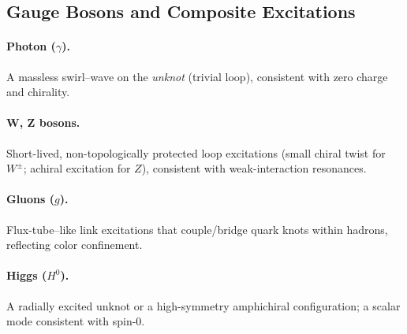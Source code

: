 \documentclass[smallextended]{svjour3}       %
\begin{document}
    \subsection{Gauge Bosons and Composite Excitations}

    \paragraph{Photon ($\gamma$).}
        A massless swirl–wave on the \emph{unknot} (trivial loop), consistent with zero charge and chirality.

    \paragraph{W, Z bosons.}
        Short-lived, non-topologically protected loop excitations (small chiral twist for $W^\pm$; achiral excitation for $Z$), consistent with weak-interaction resonances.

    \paragraph{Gluons ($g$).}
        Flux-tube–like link excitations that couple/bridge quark knots within hadrons, reflecting color confinement.

    \paragraph{Higgs ($H^0$).}
        A radially excited unknot or a high-symmetry amphichiral configuration; a scalar mode consistent with spin-0.
\end{document}
